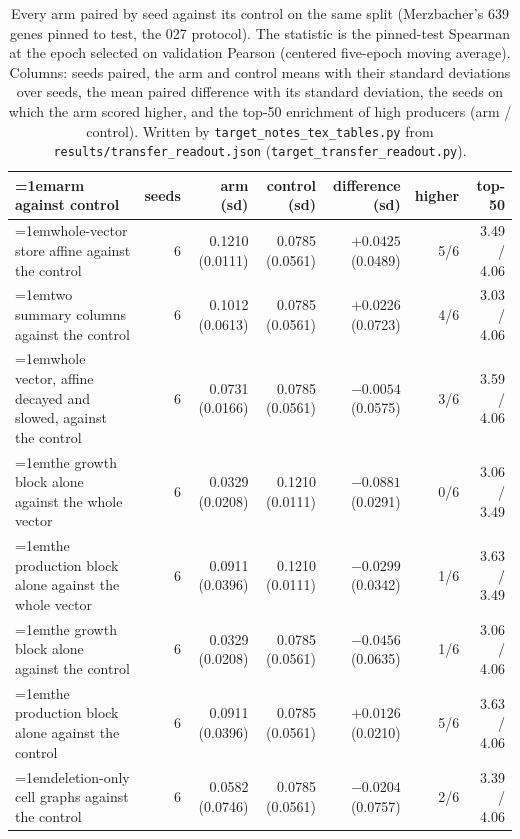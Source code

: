 \begin{table}[H]
  \centering
  \footnotesize
  \setlength{\tabcolsep}{2.5pt}
  \caption[The rounds on betaxanthin: arm against control]{Every arm paired by seed against its control on the same split (Merzbacher's 639 genes pinned to test, the 027 protocol). The statistic is the pinned-test Spearman at the epoch selected on validation Pearson (centered five-epoch moving average). Columns: seeds paired, the arm and control means with their standard deviations over seeds, the mean paired difference with its standard deviation, the seeds on which the arm scored higher, and the top-50 enrichment of high producers (arm / control). Written by \texttt{target\_notes\_tex\_tables.py} from \texttt{results/transfer\_readout.json} (\texttt{target\_transfer\_readout.py}).}
  \label{tab:target-transfer}
  \begin{tabular}{@{}>{\raggedright\hangindent=1em\hangafter=1\arraybackslash}p{78.5mm}rrrrrr@{}}
    \hline
    arm against control & seeds & arm (sd) & control (sd) & difference (sd) & higher & top-50 \\
    \hline
    whole-vector store affine against the control & 6 & 0.1210 (0.0111) & 0.0785 (0.0561) & $+0.0425$ (0.0489) & 5/6 & 3.49 / 4.06 \\
    two summary columns against the control & 6 & 0.1012 (0.0613) & 0.0785 (0.0561) & $+0.0226$ (0.0723) & 4/6 & 3.03 / 4.06 \\
    whole vector, affine decayed and slowed, against the control & 6 & 0.0731 (0.0166) & 0.0785 (0.0561) & $-0.0054$ (0.0575) & 3/6 & 3.59 / 4.06 \\
    the growth block alone against the whole vector & 6 & 0.0329 (0.0208) & 0.1210 (0.0111) & $-0.0881$ (0.0291) & 0/6 & 3.06 / 3.49 \\
    the production block alone against the whole vector & 6 & 0.0911 (0.0396) & 0.1210 (0.0111) & $-0.0299$ (0.0342) & 1/6 & 3.63 / 3.49 \\
    the growth block alone against the control & 6 & 0.0329 (0.0208) & 0.0785 (0.0561) & $-0.0456$ (0.0635) & 1/6 & 3.06 / 4.06 \\
    the production block alone against the control & 6 & 0.0911 (0.0396) & 0.0785 (0.0561) & $+0.0126$ (0.0210) & 5/6 & 3.63 / 4.06 \\
    deletion-only cell graphs against the control & 6 & 0.0582 (0.0746) & 0.0785 (0.0561) & $-0.0204$ (0.0757) & 2/6 & 3.39 / 4.06 \\

\end{tabular}
\end{table}

